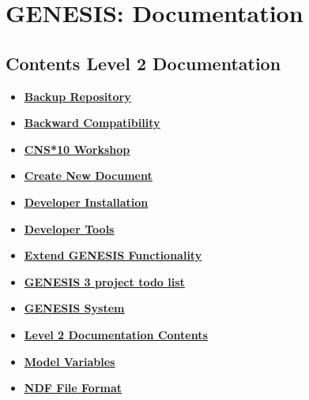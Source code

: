 \documentclass[12pt]{article}
\begin{document}
\section*{GENESIS: Documentation}

\subsection*{Contents Level 2 Documentation}

\begin{itemize}

\item \href{../backup-repository/backup-repository.pdf}{\bf \underline{Backup Repository}}

\item \href{../backward-compatibility/backward-compatibility.pdf}{\bf \underline{Backward Compatibility}}

\item \href{../cns10-workshop/cns10-workshop.pdf}{\bf \underline{CNS*10 Workshop}}

\item \href{../create-document/create-document.pdf}{\bf \underline{Create New Document}}

\item \href{../developer-installation/developer-installation.pdf}{\bf \underline{Developer Installation}}

\item \href{../developer-tools/developer-tools.pdf}{\bf \underline{Developer Tools}}

\item \href{../genesis-extend-functionality/genesis-extend-functionality.pdf}{\bf \underline{Extend GENESIS Functionality}}

\item \href{../project-todo/project-todo.pdf}{\bf \underline{GENESIS 3 project todo list}}

\item \href{../genesis-system/genesis-system.pdf}{\bf \underline{GENESIS System}}

\item \href{../contents-level2/contents-level2.pdf}{\bf \underline{Level 2 Documentation Contents}}

\item \href{../model-variables/model-variables.pdf}{\bf \underline{Model Variables}}

\item \href{../ndf-file-format/ndf-file-format.pdf}{\bf \underline{NDF File Format}}


\end{itemize}
\end{document}
